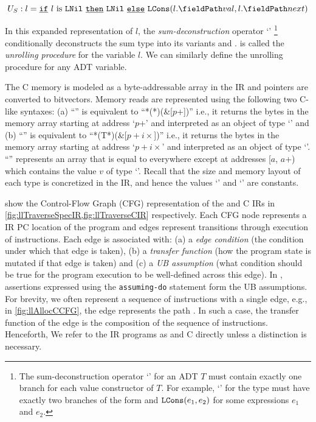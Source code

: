\begin{equation}
\label{eqn:specDeconstruct}
U_S: l = \sumIf{\sumIs{l}{LNil}} \  \sumThen{\cons{LNil}} \  \sumElse{\cons{LCons}(\prodAccess{l}{val}, \prodAccess{l}{next})}
\end{equation}

In this expanded representation of $l$,
the {\em sum-deconstruction} operator `\sumDtor{}'
\footnote{The sum-deconstruction operator `\sumDtor{}' for an ADT
$T$ must contain exactly one branch for each value constructor of $T$.
For example, `\sumDtor{}' for the  type must have exactly two branches
of the form  and ${\tt LCons}(e_1,e_2)$ for some expressions $e_1$ and $e_2$.}
conditionally deconstructs the sum type into its variants  and .
 is called the {\em unrolling procedure} for the  variable $l$.
We can similarly define the unrolling procedure for any ADT variable.

The C memory is modeled as a byte-addressable array \mem{} in the IR
and pointers are converted to bitvectors.
Memory reads are represented using the following two C-like syntaxes:
(a) ``'' is equivalent to ``*(*)(\&\mem{}[$p$+])''
i.e., it returns the bytes in the memory array \mem{} starting at address `$p$+'
and interpreted as an object of type `' and
(b) ``'' is equivalent to ``*(T*)(\&\mem{}[$p+i\times$])''
i.e., it returns the bytes in the memory array \mem{} starting at address `$p+i\times$'
and interpreted as an object of type `'.
``'' represents an array that is equal to \mem{} everywhere except at addresses
[$a$, $a$+) which contains the value $v$ of type `'.
Recall that the size and memory layout of each type is concretized in the IR,
and hence the values `' and `' are constants.

 show the Control-Flow Graph (CFG) representation
of the \SpecL{} and C IRs in \cref{fig:llTraverseSpecIR,fig:llTraverseCIR} respectively.
Each CFG node represents a IR PC location of the program and edges represent
transitions through execution of instructions.
Each edge is associated with:
(a) a {\em edge condition} (the condition under which that edge is taken),
(b) a {\em transfer function} (how the program state is mutated if that edge is taken) and
(c) a {\em UB assumption} (what condition should be true for the program execution
to be well-defined across this edge).
In \SpecL{}, assertions expressed using the {\tt assuming-do} statement
form the UB assumptions.
For brevity, we often represent a sequence of instructions with a single edge, e.g.,
in \cref{fig:llAllocCCFG}, the edge  represents the path .
In such a case, the transfer function of the edge is the composition of the sequence of instructions.
Henceforth, We refer to the IR programs as \SpecL{} and C directly unless a distinction is necessary.

